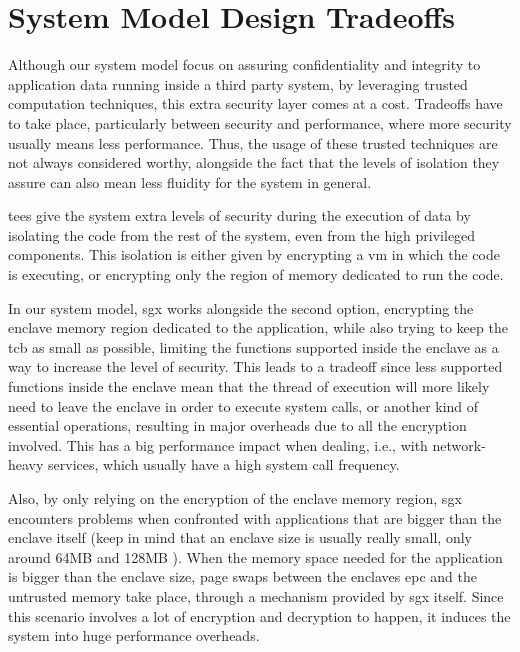   
\section{System Model Design Tradeoffs}
\label{sec:design_tradeoffs}

Although our system model focus on assuring confidentiality and integrity to application data running inside a third party system, by leveraging trusted computation techniques, this extra security layer comes at a cost. Tradeoffs have to take place, particularly between security and performance, where more security usually means less performance. 
Thus, the usage of these trusted techniques are not always considered worthy, alongside the fact that the levels of isolation they assure can also mean less fluidity for the system in general.  

\gls{tee}s give the system extra levels of security during the execution of data by isolating the code from the rest of the system, even from the high privileged components. This isolation is either given by encrypting a \gls{vm} in which the code is executing, or encrypting only the region of memory dedicated to run the code. 

In our system model, \gls{sgx} works alongside the second option, encrypting the enclave memory region dedicated to the application, while also trying to keep the \gls{tcb} as small as possible, limiting the functions supported inside the enclave as a way to increase the level of security. 
This leads to a tradeoff since less supported functions inside the enclave mean that the thread of execution will more likely need to leave the enclave in order to execute system calls, or another kind of essential operations, resulting in major overheads due to all the encryption involved. This has a big performance impact when dealing, i.e., with network-heavy services, which usually have a high system call frequency.

Also, by only relying on the encryption of the enclave memory region, \gls{sgx} encounters problems when confronted with applications that are bigger than the enclave itself (keep in mind that an enclave size is usually really small, only around 64MB and 128MB \cite{sconePaper}). 
When the memory space needed for the application is bigger than the enclave size, page swaps between the enclaves \gls{epc} and the untrusted memory take place, through a mechanism provided by \gls{sgx} itself. Since this scenario involves a lot of encryption and decryption to happen, it induces the system into huge performance overheads.


